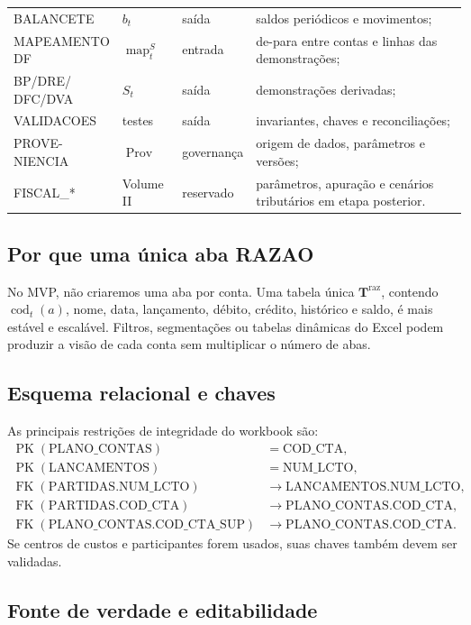\documentclass[11pt,a4paper]{article}
\newcommand{\Prov}{\operatorname{Prov}}
\newcommand{\cod}{\operatorname{cod}}
\newcommand{\map}{\operatorname{map}}
\newcommand{\FK}{\operatorname{FK}}
\newcommand{\PK}{\operatorname{PK}}
\begin{document}
\begin{longtable}{p{} p{} p{} p{}}
BALANCETE & $b_t$ & saída & saldos periódicos e movimentos;\\
\makecell[l]{MAPEAMENTO\\ DF} & $\map_t^S$ & entrada & de-para entre contas e linhas das demonstrações;\\
\makecell[l]{BP/DRE/\\ DFC/DVA} & $S_t$ & saída & demonstrações derivadas;\\
VALIDACOES & testes & saída & invariantes, chaves e reconciliações;\\
\makecell[l]{PROVE-\\ NIENCIA} & $\Prov$ & governança & origem de dados, parâmetros e versões;\\
FISCAL\_* & Volume II & reservado & parâmetros, apuração e cenários tributários em etapa posterior.\\
\bottomrule
\end{longtable}

\subsection{Por que uma única aba RAZAO}

No MVP, não criaremos uma aba por conta. Uma tabela única $\mathbf T^{\mathrm{raz}}$, contendo $\cod_t(a)$, nome, data, lançamento, débito, crédito, histórico e saldo, é mais estável e escalável. Filtros, segmentações ou tabelas dinâmicas do Excel podem produzir a visão de cada conta sem multiplicar o número de abas.

\subsection{Esquema relacional e chaves}

As principais restrições de integridade do workbook são:
\begin{align}
\PK(\mathrm{PLANO\_CONTAS})&=\mathrm{COD\_CTA},\\
\PK(\mathrm{LANCAMENTOS})&=\mathrm{NUM\_LCTO},\\
\FK(\mathrm{PARTIDAS.NUM\_LCTO})&\to\mathrm{LANCAMENTOS.NUM\_LCTO},\\
\FK(\mathrm{PARTIDAS.COD\_CTA})&\to\mathrm{PLANO\_CONTAS.COD\_CTA},\\
\FK(\mathrm{PLANO\_CONTAS.COD\_CTA\_SUP})&\to\mathrm{PLANO\_CONTAS.COD\_CTA}.
\end{align}
Se centros de custos e participantes forem usados, suas chaves também devem ser validadas.

\subsection{Fonte de verdade e editabilidade}
\end{document}

